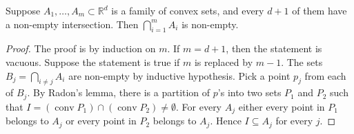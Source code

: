 \documentclass[12pt]{article}
\DeclareMathOperator{\conv}{conv}
\begin{document}
Suppose $A_1,\dotsc,A_m\subset \mathbb{R}^d$ is a family of convex sets, and every $d+1$ of them have a non-empty intersection. Then $\bigcap_{i=1}^m A_i$ is non-empty.
\begin{proof}
The proof is by induction on $m$. If $m=d+1$, then the statement is vacuous. Suppose the statement is true if $m$ is replaced by $m-1$. The sets $B_j=\bigcap_{i\neq j} A_i$ are non-empty by inductive hypothesis. Pick a point $p_j$ from each of $B_j$. By Radon's lemma, there is a partition of $p$'s into two sets $P_1$ and $P_2$ such that $I=(\conv P_1)\cap(\conv P_2)\neq \emptyset$. For every $A_j$ either every point in $P_1$ belongs to $A_j$ or every point in $P_2$ belongs to $A_j$. Hence $I\subseteq A_j$ for every $j$.
\end{proof}
\end{document}
